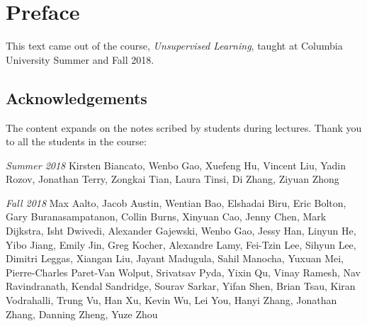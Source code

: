 \chapter*{Preface}

This text came out of the course, \textit{Unsupervised Learning},
taught at Columbia University Summer and Fall 2018. 

\section*{Acknowledgements} The content expands on the notes scribed
by students during lectures. Thank you to all the students in the
course: 

\textit{Summer 2018} Kirsten Biancato, Wenbo Gao, Xuefeng Hu,
Vincent Liu, Yadin Rozov, Jonathan Terry, Zongkai Tian, Laura Tinsi,
Di Zhang, Ziyuan Zhong

\textit{Fall 2018} Max Aalto, Jacob Austin, Wentian Bao, Elshadai
Biru, Eric Bolton, Gary Buranasampatanon, Collin Burns, Xinyuan Cao,
Jenny Chen, Mark Dijkstra, Isht Dwivedi, Alexander Gajewski, Wenbo
Gao, Jessy Han, Linyun He, Yibo Jiang, Emily Jin, Greg Kocher,
Alexandre Lamy, Fei-Tzin Lee, Sihyun Lee, Dimitri Leggas, Xiangan Liu,
Jayant Madugula, Sahil Manocha, Yuxuan Mei, Pierre-Charles Paret-Van
Wolput, Srivatsav Pyda, Yixin Qu, Vinay Ramesh, Nav Ravindranath,
Kendal Sandridge, Sourav Sarkar, Yifan Shen, Brian Tsau, Kiran
Vodrahalli, Trung Vu, Han Xu, Kevin Wu, Lei You, Hanyi Zhang, Jonathan
Zhang, Danning Zheng, Yuze Zhou 
